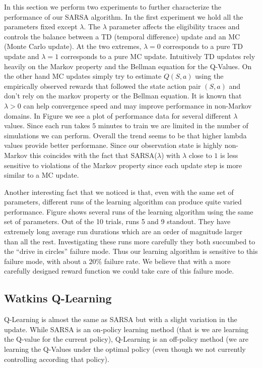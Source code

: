 \documentclass{article}
\begin{document}
In this section we perform two experiments to further characterize the performance of our SARSA algorithm. In the first experiment we hold all the parameters fixed except $\lambda$. The $\lambda$ parameter affects the eligibility traces and controls the balance between a TD (temporal difference) update and an MC (Monte Carlo update). At the two extremes, $\lambda = 0$ corresponds to a pure TD update and $\lambda = 1$ corresponds to a pure MC update. Intuitively TD updates rely heavily on the Markov property and the Bellman equation for the Q-Values. On the other hand MC updates simply try to estimate $Q(S,a)$ using the empirically observed rewards that followed the state action pair $(S,a)$ and don't rely on the markov property or the Bellman equation. It is known  that $\lambda > 0$ can help convergence speed and may improve performance in non-Markov domains. In Figure  we see a plot of performance data for several different $\lambda$ values. Since each run takes $5$ minutes to train we are limited in the number of simulations we can perform. Overall the trend seems to be that higher lambda values provide better performane. Since our observation state is highly non-Markov this coincides with the fact that SARSA($\lambda$) with $\lambda$ close to $1$ is less sensitive to violations of the Markov property since each update step is more similar to a MC update.


Another interesting fact that we noticed is that, even with the same set of parameters, different runs of the learning algorithm can produce quite varied performance. Figure  shows several runs of the learning algorithm using the same set of parameters. Out of the 10 trials, runs 5 and 9 standout. They have extremely long average run durations which are an order of magnitude larger than all the rest. Investigating these runs more carefully they both succumbed to the ``drive in circles'' failure mode. Thus our learning algorithm is sensitive to this failure mode, with about a $20\%$ failure rate. We believe that with a more carefully designed reward function we could take care of this failure mode.


\subsection{Watkins Q-Learning}
\label{discrete_q_learning}

Q-Learning is almost the same as SARSA but with a slight variation in the update. While SARSA is an on-policy learning method (that is we are learning the Q-value for the current policy), Q-Learning is an off-policy method (we are learning the Q-Values under the optimal policy (even though we not currently controlling according that policy).
\end{document}
